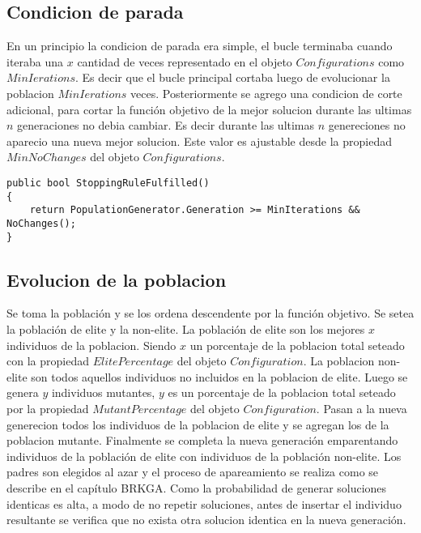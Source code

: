 \subsection{Condicion de parada}

En un principio la condicion de parada era simple, el bucle terminaba cuando iteraba una $x$ cantidad de veces representado en el objeto $Configurations$ como $MinIerations$. Es decir que el bucle principal cortaba luego de evolucionar la poblacion $MinIerations$ veces. Posteriormente se agrego una condicion de corte adicional, para cortar la función objetivo de la mejor solucion durante las ultimas $n$ generaciones no debia cambiar. Es decir durante las ultimas $n$ genereciones no aparecio una nueva mejor solucion. Este valor es ajustable desde la propiedad $MinNoChanges$ del objeto $Configurations$.

\begin{lstlisting}
public bool StoppingRuleFulfilled()
{ 
    return PopulationGenerator.Generation >= MinIterations && NoChanges();
}
\end{lstlisting}

\subsection{Evolucion de la poblacion}

Se toma la población y se los ordena descendente por la función objetivo. Se setea la población de elite y la non-elite. La población de elite son los mejores $x$ individuos de la poblacion. Siendo $x$ un porcentaje de la poblacion total seteado con la propiedad $ElitePercentage$ del objeto $Configuration$. La poblacion non-elite son todos aquellos individuos no incluidos en la poblacion de elite. Luego se genera $y$ individuos mutantes, $y$ es un porcentaje de la poblacion total seteado por la propiedad $MutantPercentage$ del objeto $Configuration$. Pasan a la nueva generecion todos los individuos de la poblacion de elite y se agregan los de la poblacion mutante. Finalmente se completa la nueva generación emparentando individuos de la población de elite con individuos de la población non-elite. Los padres son elegidos al azar y el proceso de apareamiento se realiza como se describe en el capítulo BRKGA. Como la probabilidad de generar soluciones identicas es alta, a modo de no repetir soluciones, antes de insertar el individuo resultante se verifica que no exista otra solucion identica en la nueva generación.

